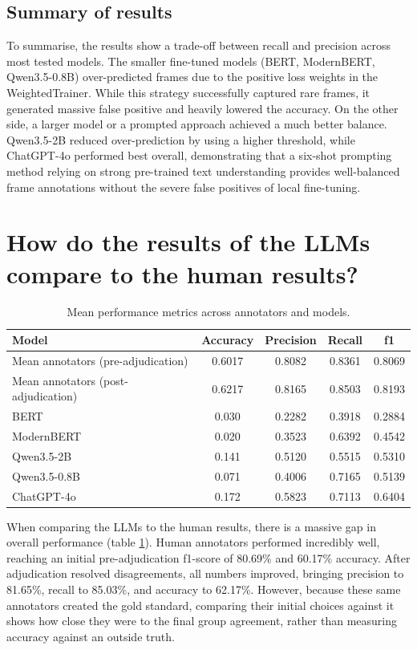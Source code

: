 \documentclass[
10pt, %
a4paper, %
oneside, %
headinclude,footinclude, %
] {book}%
\begin{document}
\subsection{Summary of results}
To summarise, the results show a trade-off between recall and precision across most tested models. The smaller fine-tuned models (BERT, ModernBERT, Qwen3.5-0.8B) over-predicted frames due to the positive loss weights in the WeightedTrainer. While this strategy successfully captured rare frames, it generated massive false positive and heavily lowered the accuracy. On the other side, a larger model or a prompted approach achieved a much better balance. Qwen3.5-2B reduced over-prediction by using a higher threshold, while ChatGPT-4o performed best overall, demonstrating that a six-shot prompting method relying on strong pre-trained text understanding provides well-balanced frame annotations without the severe false positives of local fine-tuning.


\section{How do the results of the LLMs compare to the human results?}

\begin{table}[htbp]
\centering
\begin{tabular}{|l|c|c|c|c|}
\hline
\textbf{Model} & \textbf{Accuracy} & \textbf{Precision} & \textbf{Recall} & \textbf{f1} \\
\hline
Mean annotators (pre-adjudication)  & 0.6017 & 0.8082 & 0.8361 & 0.8069 \\\hline
Mean annotators (post-adjudication) & 0.6217 & 0.8165 & 0.8503 & 0.8193 \\\hline
BERT & 0.030 & 0.2282 & 0.3918 & 0.2884 \\\hline
ModernBERT & 0.020 & 0.3523 & 0.6392 & 0.4542 \\\hline
Qwen3.5-2B & 0.141 & 0.5120 & 0.5515 & 0.5310 \\\hline
Qwen3.5-0.8B & 0.071 & 0.4006 & 0.7165 & 0.5139 \\\hline
ChatGPT-4o & 0.172 & 0.5823 & 0.7113 & 0.6404 \\\hline
\end{tabular}
\caption{Mean performance metrics across annotators and models.}
\label{tab:annotators_vs_models}
\end{table}


When comparing the LLMs to the human results, there is a massive gap in overall performance (table \ref{tab:annotators_vs_models}). Human annotators performed incredibly well, reaching an initial pre-adjudication f1-score of 80.69\% and 60.17\% accuracy. After adjudication resolved disagreements, all numbers improved, bringing precision to 81.65\%, recall to 85.03\%, and accuracy to 62.17\%. However, because these same annotators created the gold standard, comparing their initial choices against it shows how close they were to the final group agreement, rather than measuring accuracy against an outside truth.
\end{document}
